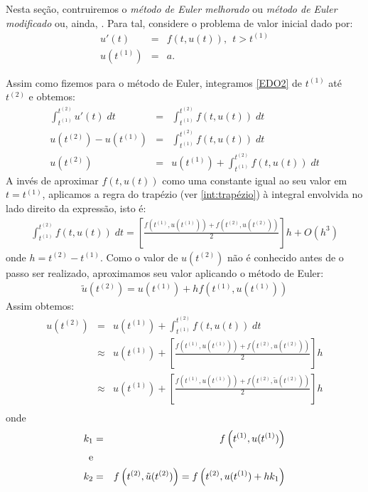 Nesta seção, contruiremos o \emph{método de Euler melhorado} ou \emph{método de Euler modificado} ou, ainda, . Para tal, considere o problema de valor inicial dado por:
\begin{eqnarray}\label{EDO2}
  u'(t)  &=& f(t,u(t)),~~t>t^{(1)} \\
  u(t^{(1)}) &=& a.
\end{eqnarray}

Assim como fizemos para o método de Euler, integramos \eqref{EDO2} de $t^{(1)}$ até $t^{(2)}$ e obtemos:
\begin{eqnarray}
  \int_{t^{(1)}}^{t^{(2)}} u'(t) \;dt &=& \int_{t^{(1)}}^{t^{(2)}} f(t,u(t)) \; dt\\
  u(t^{(2)})-u(t^{(1)})               &=& \int_{t^{(1)}}^{t^{(2)}} f(t,u(t)) \; dt\\
  u(t^{(2)})                      &=& u(t^{(1)}) +  \int _{t^{(1)}}^{t^{(2)}} f(t,u(t)) \; dt
\end{eqnarray}
A invés de aproximar $f(t,u(t))$ como uma constante igual ao seu valor em $t=t^{(1)}$, aplicamos a regra do trapézio (ver \ref{int:trapézio}) à integral envolvida no lado direito da expressão, isto é:
\begin{eqnarray}\label{pvi:euler_mel_eq}
\int _{t^{(1)}}^{t^{(2)}} f(t,u(t)) \; dt = \left[\frac{f\left(t^{(1)},u(t^{(1)})\right)+f\left(t^{(2)},u(t^{(2)})\right)}{2}\right]h + O(h^3)
\end{eqnarray}
onde $h=t^{(2)}-t^{(1)}$.
Como o valor de $u(t^{(2)})$ não é conhecido antes de o passo ser realizado, aproximamos seu valor aplicando o método de Euler:
\begin{eqnarray*}
\tilde{u}(t^{(2)})= u(t^{(1)})+h f\left(t^{(1)},u(t^{(1)})\right)
\end{eqnarray*}
Assim obtemos:
\begin{eqnarray*}
  u(t^{(2)})&=& u(t^{(1)}) +  \int _{t^{(1)}}^{t^{(2)}} f(t,u(t)) \; dt\\
  &\approx& u(t^{(1)}) +\left[\frac{f\left(t^{(1)},u(t^{(1)})\right)+f\left(t^{(2)},u(t^{(2)})\right)}{2}\right]h\\
  &\approx& u(t^{(1)}) +\left[\frac{f\left(t^{(1)},u(t^{(1)})\right)+f\left(t^{(2)},\tilde{u}(t^{(2)})\right)}{2}\right]h\\
\end{eqnarray*}
onde 
\begin{eqnarray*}
k_1&=&f\left(t^{(1)},u(t^{(1)})\right)\\
\hbox{e}\\
k_2&=&f\left(t^{(2)},\tilde{u}(t^{(2)})\right)=f\left(t^{(2)}, u(t^{(1)})+hk_1 \right )
\end{eqnarray*}

